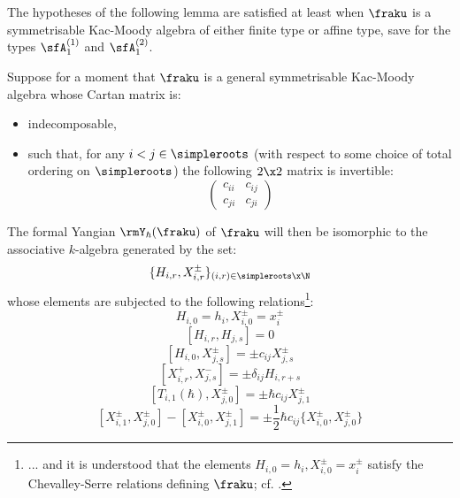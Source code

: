         The hypotheses of the following lemma are satisfied at least when $\fraku$ is a symmetrisable Kac-Moody algebra of either finite type or affine type, save for the types $\sfA_1^{(1)}$ and $\sfA_1^{(2)}$.
        \begin{lemma} \label{lemma: levendorskii_presentation_for_yangians_of_symmetrisable_kac_moody_algebras}
            \cite[Theorem 2.13]{guay_nakajima_wendlandt_affine_yangian_coproduct} Suppose for a moment that $\fraku$ is a general symmetrisable Kac-Moody algebra whose Cartan matrix is:
            \begin{itemize}
                \item indecomposable,
                \item such that, for any $i < j \in \simpleroots$ (with respect to some choice of total ordering on $\simpleroots$) the following $2 \x 2$ matrix is invertible:
                    $$
                        \begin{pmatrix}
                            c_{ii} & c_{ij}
                            \\
                            c_{ji} & c_{ji}
                        \end{pmatrix}
                    $$
            \end{itemize}
            The formal Yangian $\rmY_{\hbar}(\fraku)$ of $\fraku$ will then be isomorphic to the associative $k$-algebra generated by the set:
                $$\{ H_{i, r}, X_{i, r}^{\pm} \}_{(i, r) \in \simpleroots \x \N}$$
            whose elements are subjected to the following relations\footnote{... and it is understood that the elements $H_{i, 0} = h_i, X_{i, 0}^{\pm} = x_i^{\pm}$ satisfy the Chevalley-Serre relations defining $\fraku$; cf. \cite[Chapter 1]{kac_infinite_dimensional_lie_algebras}.}:
                $$H_{i, 0} = h_i, X_{i, 0}^{\pm} = x_i^{\pm}$$
                $$[ H_{i, r}, H_{j, s} ] = 0$$
                $$[ H_{i, 0}, X_{j, s}^{\pm} ] = \pm c_{ij} X_{j, s}^{\pm}$$
                $$[ X_{i, r}^+, X_{j, s}^- ] = \pm \delta_{ij} H_{i, r + s}$$
                $$\left[ T_{i, 1}(\hbar), X_{j, 0}^{\pm} \right] = \pm \hbar c_{ij} X_{j, 1}^{\pm}$$
                $$[ X_{i, 1}^{\pm}, X_{j, 0}^{\pm} ] - [ X_{i, 0}^{\pm}, X_{j, 1}^{\pm} ] = \pm \frac12 \hbar c_{ij} \{X_{i, 0}^{\pm}, X_{j, 0}^{\pm}\}$$
        \end{lemma}
